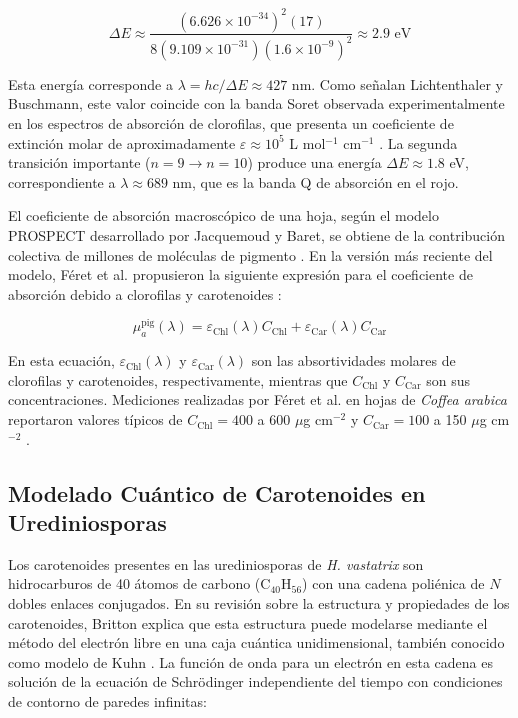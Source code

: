 \documentclass[12pt, a4paper]{article}
\begin{document}
	\begin{equation}
		\Delta E \approx \frac{(6.626 \times 10^{-34})^2 (17)}{8 (9.109 \times 10^{-31}) (1.6 \times 10^{-9})^2} \approx 2.9 \text{ eV}
		\label{eq:energia_clorofila}
	\end{equation}
	
	Esta energía corresponde a $\lambda = hc/\Delta E \approx 427$ nm. Como señalan Lichtenthaler y Buschmann, este valor coincide con la banda Soret observada experimentalmente en los espectros de absorción de clorofilas, que presenta un coeficiente de extinción molar de aproximadamente $\varepsilon \approx 10^5$ L mol$^{-1}$ cm$^{-1}$ \parencite{lichtenthaler2001}. La segunda transición importante ($n=9 \rightarrow n=10$) produce una energía $\Delta E \approx 1.8$ eV, correspondiente a $\lambda \approx 689$ nm, que es la banda Q de absorción en el rojo.
	
	El coeficiente de absorción macroscópico de una hoja, según el modelo PROSPECT desarrollado por Jacquemoud y Baret, se obtiene de la contribución colectiva de millones de moléculas de pigmento \parencite{jacquemoud1990}. En la versión más reciente del modelo, Féret et al. propusieron la siguiente expresión para el coeficiente de absorción debido a clorofilas y carotenoides \parencite{feret2008}:
	
	\begin{equation}
		\mu_a^{\text{pig}}(\lambda) = \varepsilon_{\text{Chl}}(\lambda) C_{\text{Chl}} + \varepsilon_{\text{Car}}(\lambda) C_{\text{Car}}
		\label{eq:mu_a_pigmentos}
	\end{equation}
	
	En esta ecuación, $\varepsilon_{\text{Chl}}(\lambda)$ y $\varepsilon_{\text{Car}}(\lambda)$ son las absortividades molares de clorofilas y carotenoides, respectivamente, mientras que $C_{\text{Chl}}$ y $C_{\text{Car}}$ son sus concentraciones. Mediciones realizadas por Féret et al. en hojas de \textit{Coffea arabica} reportaron valores típicos de $C_{\text{Chl}} = 400$ a 600 $\mu$g cm$^{-2}$ y $C_{\text{Car}} = 100$ a 150 $\mu$g cm$^{-2}$ \parencite{feret2008}.
	
	\subsection{Modelado Cuántico de Carotenoides en Urediniosporas}
	
	Los carotenoides presentes en las urediniosporas de \textit{H. vastatrix} son hidrocarburos de 40 átomos de carbono ($\text{C}_{40}\text{H}_{56}$) con una cadena poliénica de $N$ dobles enlaces conjugados. En su revisión sobre la estructura y propiedades de los carotenoides, Britton explica que esta estructura puede modelarse mediante el método del electrón libre en una caja cuántica unidimensional, también conocido como modelo de Kuhn \parencite{Britton1995}. La función de onda para un electrón en esta cadena es solución de la ecuación de Schrödinger independiente del tiempo con condiciones de contorno de paredes infinitas:
	
\end{document}
